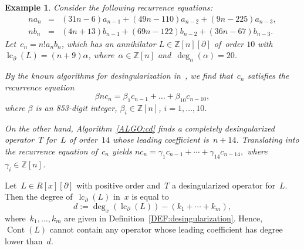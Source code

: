 \documentclass{sig-alternate}
\newcommand{\bZ} { {\mathbb{Z}}}
\newcommand{\cont}{\operatorname{Cont}}
\newcommand{\lc}{\operatorname{lc}}
\newcommand{\pa}{\partial}
\newtheorem{example}[theorem]{Example}
\begin{document}
\begin{example}
Consider the following recurrence equations:
{\small \[ \begin{array}{lll}
n a_n  & = & (31 n - 6) a_{n - 1} + (49 n - 110) a_{n - 2} + (9 n - 225) a_{n - 3}, \\
n b_n  & = & (4 n + 13) b_{n - 1} + (69 n - 122) b_{n - 2} + (36 n - 67) b_{n - 3}.
\end{array} \]}
Let~$c_n = n! a_n b_n$,  which has an annihilator $L \in \bZ[n][\pa]$ of~order $10$ with~$\lc_\pa(L) {=} (n + 9) \alpha$,
where~$\alpha {\in} \bZ[n]$ and~$\deg_{n}(\alpha) {=} 20$.

By the known algorithms for desingularization in~\cite{Abramov1999, Abramov2006, Chen2013, Chen2016}, we find
that~$c_n$ satisfies the recurrence equation
\[ \beta n c_n = \beta_1 c_{n - 1} + \ldots + \beta_{10} c_{n - 10},
\]
where $\beta$ is an 853-digit integer, $\beta_i \in \bZ[n]$, $i = 1, \ldots, 10$.

On the other hand, Algorithm~\ref{ALGO:cd} finds a completely desingularized operator~$T$ for~$L$ of order~$14$ whose
leading coefficient is~$n + 14$. Translating into the recurrence equation of~$c_n$ yields
$n c_n = \gamma_1 c_{n - 1} + \cdots + \gamma_{14} c_{n - 14},$
where $\gamma_i \in \bZ[n]$.
\end{example}

Let~$L \in R[x][\pa]$ with positive order and~$T$ a desingularized operator for~$L$. Then
the degree of~$\lc_\pa(L)$ in~$x$ is equal to
\[  d:= \deg_x\left( \lc_\pa(L) \right) - (k_1 + \cdots + k_m), \]
where~$k_1, \ldots, k_m$ are given in Definition~\ref{DEF:desingularization}. Hence,~$\cont(L)$
cannot contain any  operator whose leading coefficient has degree lower than~$d$.
\end{document}
